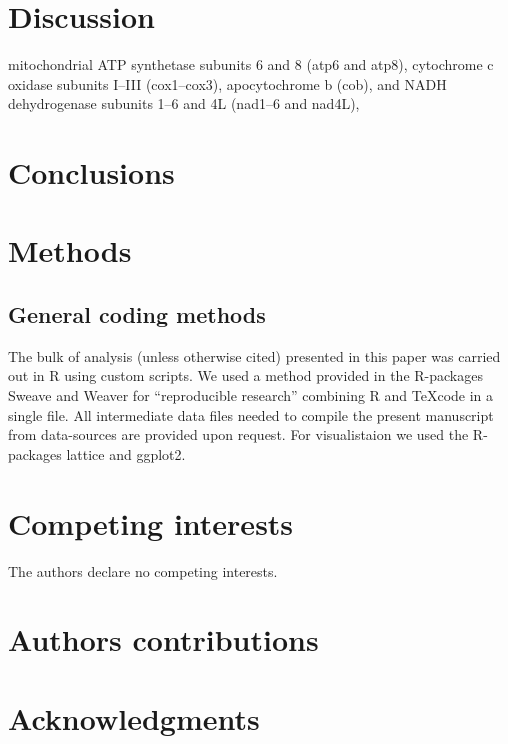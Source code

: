 \documentclass[10pt]{bmc_article}
\newenvironment{bmcformat}{\begin{raggedright}\baselineskip20pt\sloppy\setboolean{publ}{false}}{\end{raggedright}\baselineskip20pt\sloppy}
\begin{document}
\begin{bmcformat}
\section*{Discussion}

mitochondrial ATP synthetase subunits 6 and 8 (atp6 and atp8),
cytochrome c oxidase subunits I–III (cox1–cox3), apocytochrome b
(cob), and NADH dehydrogenase subunits 1–6 and 4L (nad1–6 and nad4L),


\section*{Conclusions}

\section*{Methods}

\subsection*{General coding methods}

The bulk of analysis (unless otherwise cited) presented in this paper
was carried out in R \cite{R_project} using custom scripts. We used a
method provided in the R-packages
Sweave\cite{lmucs-papers:Leisch:2002} and Weaver\cite{weaver} for
``reproducible research'' combining R and \TeX code in a single
file. All intermediate data files needed to compile the present
manuscript from data-sources are provided upon request. For
visualistaion we used the R-packages lattice\cite{lattice-book} and
ggplot2\cite{ggplot-book}.


\section*{Competing interests}
The authors declare no competing interests.

\section*{Authors contributions}

\section*{Acknowledgments}


\end{bmcformat}
\end{document}
